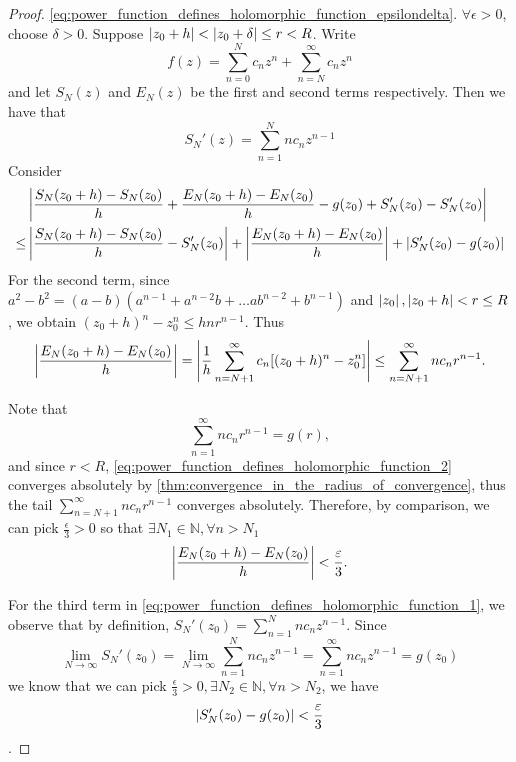 \documentclass[11pt, oneside]{book}
\begin{document}
\begin{proof}
	\WTP \eqref{eq:power_function_defines_holomorphic_function_epsilondelta}. $\forall \epsilon > 0$, choose $\delta > 0$. Suppose $\left|z_0 + h\right| < \left|z_0 + \delta\right| \leq r < R$. Write
	\begin{equation*}
		f(z) = \sum_{n=0}^{N} c_n z^n + \sum_{n=N}^{\infty} c_n z^n
	\end{equation*}
	and let $S_N(z)$ and $E_N(z)$ be the first and second terms respectively.
	Then we have that
	\begin{equation*}
		S_N'(z) = \sum_{n=1}^{N} nc_n z^{n - 1}
	\end{equation*}
	Consider
	\begin{align}
			&\left|\frac{S_N(z_0 + h) - S_N(z_0)}{h} + \frac{E_N(z_0 + h) - E_N(z_0)}{h} - g(z_0) + S_N'(z_0) - S_N'(z_0)\right| \nonumber \\
		\leq &\left|\frac{S_N(z_0 + h) - S_N(z_0)}{h} - S_N'(z_0)\right| + \left|\frac{E_N(z_0 + h) - E_N(z_0)}{h}\right| + \left|S_N'(z_0) - g(z_0)\right| \label{eq:power_function_defines_holomorphic_function_1}
	\end{align}
	For the second term, since $a^2 - b^2 = (a - b)(a^{n - 1} + a^{n - 2}b + \hdots ab^{n - 2} + b^{n - 1})$ and $\left|z_0\right|, \left|z_0 + h\right| < r \leq R$, we obtain $(z_0 + h)^n - z_0^n \leq hnr^{n - 1}$. Thus
	\begin{equation*}
		\left|\frac{E_N(z_0 + h) - E_N(z_0)}{h}\right| = \left|\frac{1}{h} \sum_{n=N+1}^{\infty} c_n [(z_0 + h)^n - z_0^n]\right| \leq \sum_{n=N+1}^{\infty} nc_nr^{n-1}.
	\end{equation*}

	Note that
	\begin{equation}\label{eq:power_function_defines_holomorphic_function_2}
		\sum_{n=1}^{\infty} nc_nr^{n-1} = g(r),
	\end{equation}
	and since $r < R$, \cref{eq:power_function_defines_holomorphic_function_2} converges absolutely by \cref{thm:convergence_in_the_radius_of_convergence}, thus the tail
	$\sum_{n=N+1}^{\infty} nc_n r^{n - 1}$ converges absolutely. Therefore, by comparison, we can pick $\frac{\epsilon}{3} > 0$ so that $\exists N_1 \in \mathbb{N}, \forall n > N_1$
	\begin{equation*}
		\left|\frac{E_N(z_0 + h) - E_N(z_0)}{h}\right| < \frac{\varepsilon}{3}.
	\end{equation*}
	
	For the third term in \cref{eq:power_function_defines_holomorphic_function_1}, we observe that by definition, $S_N'(z_0) = \sum_{n=1}^{N} nc_n z^{n - 1}$. Since
	\begin{equation*}
		\lim_{N \to \infty} S_N'(z_0) = \lim_{N \to \infty} \sum_{n=1}^{N} nc_n z^{n - 1} = \sum_{n=1}^{\infty} nc_n z^{n - 1} = g(z_0)
	\end{equation*}
	we know that we can pick $\frac{\epsilon}{3} > 0, \exists N_2 \in \mathbb{N}, \forall n > N_2$, we have
	\begin{equation*}
		\left|S_N'(z_0) - g(z_0)\right| < \frac{\varepsilon}{3}
	\end{equation*}.


\end{proof}
\end{document}
